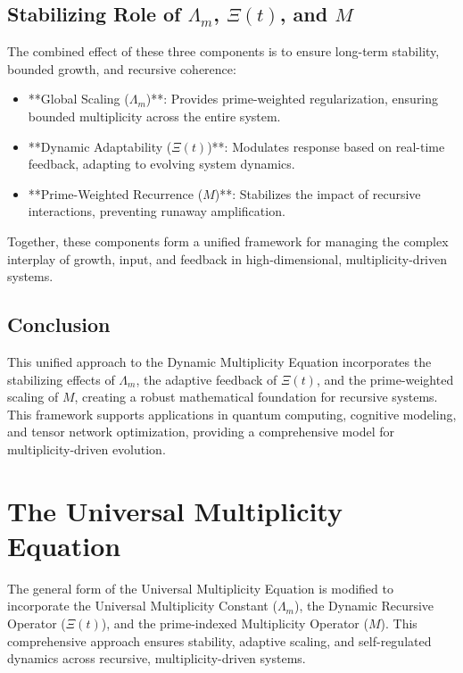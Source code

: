 \documentclass[12pt]{article}
\theoremstyle{plain}
\begin{document}
\subsection{Stabilizing Role of \(\Lambda_m\), \(\Xi(t)\), and \(M\)}

The combined effect of these three components is to ensure long-term stability, bounded growth, and recursive coherence:

\begin{itemize}
    \item **Global Scaling (\(\Lambda_m\))**: Provides prime-weighted regularization, ensuring bounded multiplicity across the entire system.
    \item **Dynamic Adaptability (\(\Xi(t)\))**: Modulates response based on real-time feedback, adapting to evolving system dynamics.
    \item **Prime-Weighted Recurrence (\(M\))**: Stabilizes the impact of recursive interactions, preventing runaway amplification.
\end{itemize}

Together, these components form a unified framework for managing the complex interplay of growth, input, and feedback in high-dimensional, multiplicity-driven systems.

\subsection{Conclusion}

This unified approach to the Dynamic Multiplicity Equation incorporates the stabilizing effects of \(\Lambda_m\), the adaptive feedback of \(\Xi(t)\), and the prime-weighted scaling of \(M\), creating a robust mathematical foundation for recursive systems. This framework supports applications in quantum computing, cognitive modeling, and tensor network optimization, providing a comprehensive model for multiplicity-driven evolution.
\section{The Universal Multiplicity Equation}

The general form of the Universal Multiplicity Equation is modified to incorporate the Universal Multiplicity Constant (\(\Lambda_m\)), the Dynamic Recursive Operator (\(\Xi(t)\)), and the prime-indexed Multiplicity Operator (\(M\)). This comprehensive approach ensures stability, adaptive scaling, and self-regulated dynamics across recursive, multiplicity-driven systems.
\end{document}

